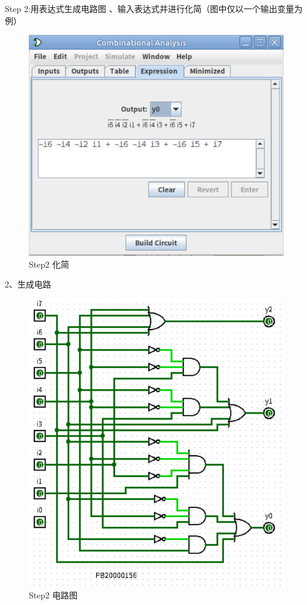 \documentclass[UTF8]{ctexart}
\begin{document}
\newline
Step 2:用表达式生成电路图
、输入表达式并进行化简（图中仅以一个输出变量为例）
\newline
\begin{figure}[h!]
    \centering
    \includegraphics{S2_2.PNG}
    \caption{Step2 化简}
\end{figure}
2、生成电路
\newline
\begin{figure}[h!]
    \centering
    \includegraphics{S2_1.PNG}
    \caption{Step2 电路图}
\end{figure}
\end{document}

